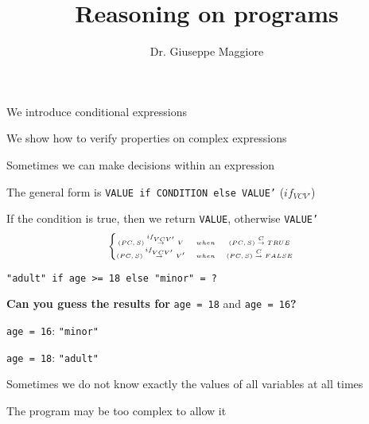 \documentclass{beamer}
\title{Reasoning on programs}
\author{Dr. Giuseppe Maggiore}
\institute{Hogeschool Rotterdam \\ 
Rotterdam, Netherlands}
\date{}
\begin{document}
\maketitle

\begin{slide}{
\item We introduce conditional expressions
\item We show how to verify properties on complex expressions
}\end{slide}

\begin{slide}{
\item Sometimes we can make decisions within an expression
\item The general form is \texttt{VALUE if CONDITION else VALUE'} ($if_{VCV'}$)
\item If the condition is true, then we return \texttt{VALUE}, otherwise \texttt{VALUE'}
$$
\tiny
\left\{
\begin{matrix}
(PC,S) \overset{if_{VCV'}}{\rightarrow} V &when& (PC,S) \overset{C}{\rightarrow} TRUE & \\
(PC,S) \overset{if_{VCV'}}{\rightarrow} V' &when& (PC,S) \overset{C}{\rightarrow} FALSE & \\
\end{matrix}
\right.
$$
}\end{slide}

\begin{slide}{
\item \texttt{"adult" if age >= 18 else "minor" = ?}
\item \textbf{Can you guess the results for} \texttt{age = 18} and \texttt{age = 16}\textbf{?}
\pause
\item \texttt{age = 16}: \texttt{"minor"}
\item \texttt{age = 18}: \texttt{"adult"}
}\end{slide}

\begin{slide}{
\item Sometimes we do not know exactly the values of all variables at all times
\item The program may be too complex to allow it
}\end{slide}
\end{document}
